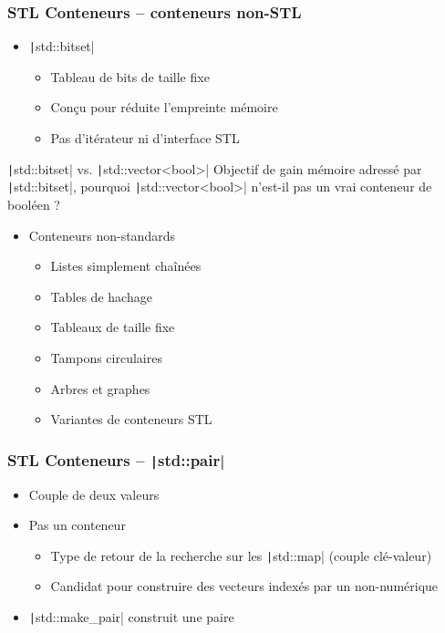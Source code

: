 \documentclass[C++.tex]{subfiles}
\begin{document}
\begin{frame}[fragile]
	\frametitle{STL Conteneurs -- conteneurs non-STL}
	\begin{itemize}
		\item \texttt|std::bitset|
		\begin{itemize}
			\item Tableau de bits de taille fixe
			\item Conçu pour réduite l'empreinte mémoire
			\item Pas d'itérateur ni d'interface STL
		\end{itemize}
	\end{itemize}

	\begin{block}{\texttt|std::bitset| vs. \texttt|std::vector<bool>|}
		Objectif de gain mémoire adressé par \texttt|std::bitset|, pourquoi \texttt|std::vector<bool>| n'est-il pas un vrai conteneur de booléen ?
	\end{block}

	\begin{itemize}
		\item Conteneurs non-standards
		\begin{itemize}
			\item Listes simplement chaînées
			\item Tables de hachage
			\item Tableaux de taille fixe
			\item Tampons circulaires
			\item Arbres et graphes
			\item Variantes de conteneurs STL

		\end{itemize}
	\end{itemize}
\end{frame}

\begin{frame}[fragile]
	\frametitle{STL Conteneurs -- \texttt|std::pair|}
	\begin{itemize}
		\item Couple de deux valeurs
		\item Pas un conteneur
		\begin{itemize}
			\item Type de retour de la recherche sur les \texttt|std::map| (couple clé-valeur)
			\item Candidat pour construire des vecteurs indexés par un non-numérique
		\end{itemize}
		\item \texttt|std::make_pair| construit une paire
	\end{itemize}
\end{frame}
\end{document}
